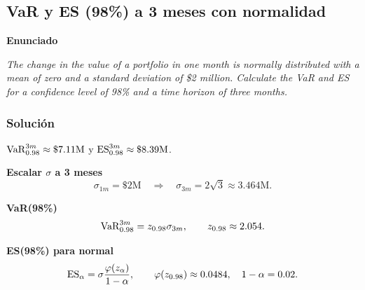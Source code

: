 ﻿\subsection{VaR y ES (98\%) a 3 meses con normalidad}

\textbf{Enunciado}

\emph{The change in the value of a portfolio in one month is normally distributed with a mean of zero and a standard deviation of \$2 million. Calculate the VaR and ES for a confidence level of 98\% and a time horizon of three months.}

\subsubsection*{Solución}

\(\mathrm{VaR}_{0.98}^{3m}\approx \$7.11\text{M}\) y \(\mathrm{ES}_{0.98}^{3m}\approx \$8.39\text{M}\).


\textbf{Escalar \(\sigma\) a 3 meses}\\
\[
\sigma_{1m}=\$2\text{M}\quad\Rightarrow\quad \sigma_{3m}=2\sqrt{3}\approx 3.464\text{M}.
\]

\textbf{VaR(98\%)}\\
\[
\mathrm{VaR}_{0.98}^{3m}=z_{0.98}\sigma_{3m},\qquad z_{0.98}\approx 2.054.
\]

\textbf{ES(98\%) para normal}\\
\[
\mathrm{ES}_\alpha=\sigma\frac{\varphi(z_\alpha)}{1-\alpha},\qquad \varphi(z_{0.98})\approx 0.0484, \quad 1-\alpha=0.02.
\]









